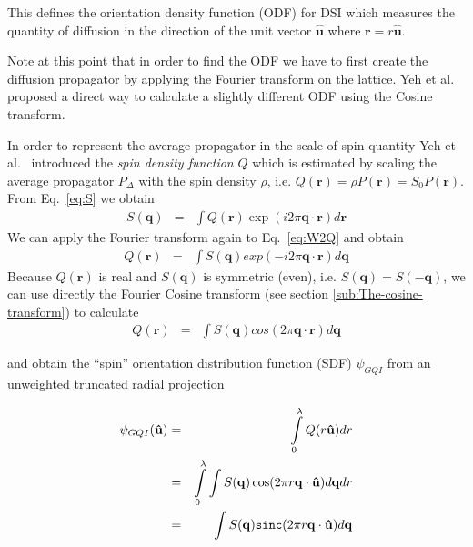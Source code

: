 \documentclass{bioinfo}
\begin{document}
\noindent This defines the \foreignlanguage{british}{orientation
density function (ODF) for DSI which measures the quantity of diffusion
in the direction of the unit vector $\mathbf{\hat{u}}$ where $\mathbf{r=}r\hat{\mathbf{u}}$.}

%
Note at this point that in order to find the ODF we have to first
create the diffusion propagator by \foreignlanguage{english}{applying}
the Fourier transform on the lattice. \foreignlanguage{english}{Yeh
et al.~\cite{Yeh2010} proposed a direct way to calculate a slightly
different ODF using the Cosine transform.}

%
In order to represent the average propagator in the scale of spin
quantity Yeh et al.~\cite{Yeh2010} introduced the \emph{spin density
function }$Q$ which is estimated by scaling the average propagator
$P_{\Delta}$ with the spin density $\rho$, i.e. $Q(\mathbf{r})=\rho P(\mathbf{r})=S_{0}P(\mathbf{r})$.
From Eq.~\ref{eq:S} we obtain\foreignlanguage{british}{\begin{eqnarray}
S(\mathbf{q}) & = & \int Q(\mathbf{r})\exp(i2\pi\mathbf{q}\cdot\mathbf{r})d\mathbf{r}\label{eq:W2Q}\end{eqnarray}
}We can apply the Fourier transform again to Eq.~\ref{eq:W2Q} and
obtain\begin{eqnarray}
Q(\mathbf{r}) & = & \int S(\mathbf{q})exp(-i2\pi\mathbf{q}\cdot\mathbf{r})d\mathbf{q}\label{eq:Q2S_complex}\end{eqnarray}
Because\foreignlanguage{british}{ $Q(\mathbf{r})$} is real and $S(\mathbf{q})$
is symmetric (even), i.e. $S(\mathbf{q})=S(-\mathbf{q})$, we can
use directly the Fourier Cosine transform (see section \ref{sub:The-cosine-transform})
to calculate\begin{eqnarray}
Q(\mathbf{r}) & = & \int S(\mathbf{q})cos(2\pi\mathbf{q}\cdot\mathbf{r})d\mathbf{q}\label{eq:cosine_transform}\end{eqnarray}


\noindent and obtain the {}``spin'' orientation distribution function
(SDF) $\psi_{GQI}$ from an unweighted truncated radial projection

\begin{eqnarray}
\psi_{GQI}(\mathbf{\hat{u}}) & = & \intop_{0}^{\lambda}Q(r\mathbf{\hat{u}})dr\label{eq:SDF}\\
 & = & \intop_{0}^{\lambda}\int S(\mathbf{q})\cos(2\pi r\mathbf{q}\cdot\mathbf{\hat{u}})d\mathbf{q}dr\\
 & = & \int S(\mathbf{q})\mathtt{sinc}(2\pi r\mathbf{q}\cdot\mathbf{\hat{u}})d\mathbf{q}\end{eqnarray}
\end{document}
